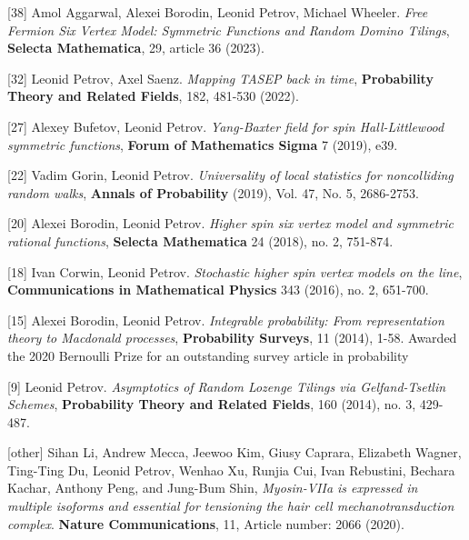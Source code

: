 \documentclass[letterpaper,11pt]{article}
\begin{document}
\begin{etaremune}
		\item[{[38]}] 
		Amol Aggarwal, Alexei Borodin, Leonid Petrov, Michael Wheeler.
		\emph{Free Fermion Six Vertex Model: Symmetric Functions and Random Domino Tilings}, \textbf{Selecta Mathematica}, 29, article 36 (2023).
	
		\item[{[32]}] 
		Leonid Petrov, Axel Saenz.
		\emph{Mapping TASEP back in time}, \textbf{Probability Theory and Related Fields}, 182, 481-530 (2022). 

	
		\item[{[27]}] 
		Alexey Bufetov, Leonid Petrov.
		\emph{Yang-Baxter field for spin Hall-Littlewood symmetric functions}, \textbf{Forum of Mathematics Sigma} 7 (2019), e39. 

		
		\item[{[22]}] 
		Vadim Gorin, Leonid Petrov.
		\emph{Universality of local statistics for noncolliding random walks}, \textbf{Annals of Probability} (2019), Vol. 47, No. 5, 2686-2753. 

			
		\item[{[20]}] 
		Alexei Borodin, Leonid Petrov.
		\emph{Higher spin six vertex model and symmetric rational functions}, \textbf{Selecta Mathematica} 24 (2018), no. 2, 751-874. 

		\item[{[18]}] 
		Ivan Corwin, Leonid Petrov.
		\emph{Stochastic higher spin vertex models on the line}, \textbf{Communications in Mathematical Physics} 343 (2016), no. 2, 651-700. 

		
		
		\item[{[15]}] 
		Alexei Borodin, Leonid Petrov.
		\emph{Integrable probability: From representation theory to Macdonald processes}, \textbf{Probability Surveys}, 11 (2014), 1-58. 
		 Awarded the 2020 Bernoulli Prize for 
		an outstanding survey article in probability 
		
		
		
		

		
		
		
		\item[{[9]}] 
		Leonid Petrov.
		\emph{Asymptotics of Random Lozenge Tilings via Gelfand-Tsetlin Schemes}, \textbf{Probability Theory and Related Fields}, 160 (2014), no. 3, 429-487. 

	
			\item[{[other]}]
			Sihan Li, Andrew Mecca, Jeewoo Kim, Giusy Caprara, Elizabeth Wagner, Ting-Ting Du, Leonid Petrov, Wenhao Xu, Runjia Cui, Ivan Rebustini, Bechara Kachar, Anthony Peng, and Jung-Bum Shin,
	\emph{Myosin-VIIa is expressed in multiple isoforms and essential for tensioning the hair cell mechanotransduction complex}.
	\textbf{Nature Communications}, 11, Article number: 2066 (2020).
		\end{etaremune}
\end{document}
